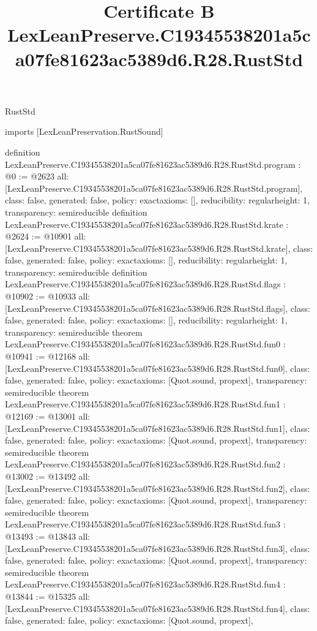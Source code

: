 \begin{lexlean}{RustStd}
\title{Certificate B LexLeanPreserve.C19345538201a5ca07fe81623ac5389d6.R28.RustStd}
\begin{coremodule}
imports [LexLeanPreservation.RustSound]

definition LexLeanPreserve.C19345538201a5ca07fe81623ac5389d6.R28.RustStd.program : @0 := @2623 {
  all: [LexLeanPreserve.C19345538201a5ca07fe81623ac5389d6.R28.RustStd.program],
  class: false,
  generated: false,
  policy: exact{axioms: []},
  reducibility: regular{height: 1},
  transparency: semireducible
}
definition LexLeanPreserve.C19345538201a5ca07fe81623ac5389d6.R28.RustStd.krate : @2624 := @10901 {
  all: [LexLeanPreserve.C19345538201a5ca07fe81623ac5389d6.R28.RustStd.krate],
  class: false,
  generated: false,
  policy: exact{axioms: []},
  reducibility: regular{height: 1},
  transparency: semireducible
}
definition LexLeanPreserve.C19345538201a5ca07fe81623ac5389d6.R28.RustStd.flags : @10902 := @10933 {
  all: [LexLeanPreserve.C19345538201a5ca07fe81623ac5389d6.R28.RustStd.flags],
  class: false,
  generated: false,
  policy: exact{axioms: []},
  reducibility: regular{height: 1},
  transparency: semireducible
}
theorem LexLeanPreserve.C19345538201a5ca07fe81623ac5389d6.R28.RustStd.fun0 : @10941 := @12168 {
  all: [LexLeanPreserve.C19345538201a5ca07fe81623ac5389d6.R28.RustStd.fun0],
  class: false,
  generated: false,
  policy: exact{axioms: [Quot.sound, propext]},
  transparency: semireducible
}
theorem LexLeanPreserve.C19345538201a5ca07fe81623ac5389d6.R28.RustStd.fun1 : @12169 := @13001 {
  all: [LexLeanPreserve.C19345538201a5ca07fe81623ac5389d6.R28.RustStd.fun1],
  class: false,
  generated: false,
  policy: exact{axioms: [Quot.sound, propext]},
  transparency: semireducible
}
theorem LexLeanPreserve.C19345538201a5ca07fe81623ac5389d6.R28.RustStd.fun2 : @13002 := @13492 {
  all: [LexLeanPreserve.C19345538201a5ca07fe81623ac5389d6.R28.RustStd.fun2],
  class: false,
  generated: false,
  policy: exact{axioms: [Quot.sound, propext]},
  transparency: semireducible
}
theorem LexLeanPreserve.C19345538201a5ca07fe81623ac5389d6.R28.RustStd.fun3 : @13493 := @13843 {
  all: [LexLeanPreserve.C19345538201a5ca07fe81623ac5389d6.R28.RustStd.fun3],
  class: false,
  generated: false,
  policy: exact{axioms: [Quot.sound, propext]},
  transparency: semireducible
}
theorem LexLeanPreserve.C19345538201a5ca07fe81623ac5389d6.R28.RustStd.fun4 : @13844 := @15325 {
  all: [LexLeanPreserve.C19345538201a5ca07fe81623ac5389d6.R28.RustStd.fun4],
  class: false,
  generated: false,
  policy: exact{axioms: [Quot.sound, propext]},
}
\end{coremodule}
\end{lexlean}
